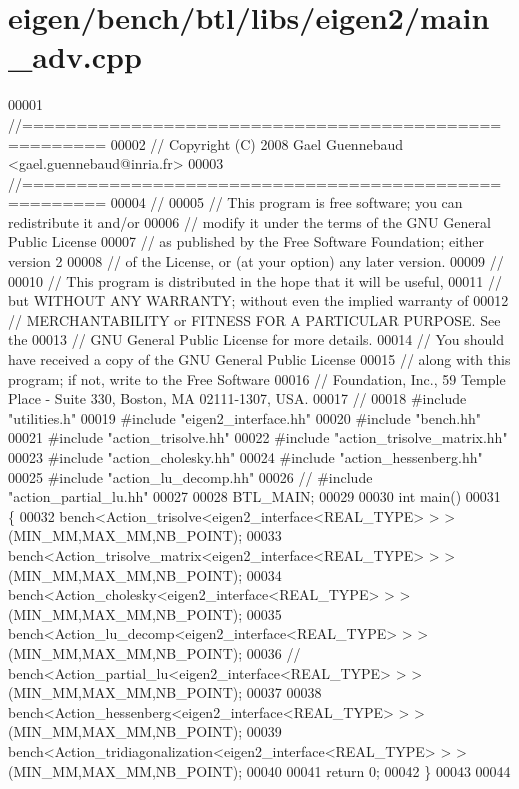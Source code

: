 \hypertarget{eigen_2bench_2btl_2libs_2eigen2_2main__adv_8cpp_source}{}\section{eigen/bench/btl/libs/eigen2/main\+\_\+adv.cpp}
\label{eigen_2bench_2btl_2libs_2eigen2_2main__adv_8cpp_source}

\begin{DoxyCode}
00001 \textcolor{comment}{//=====================================================}
00002 \textcolor{comment}{// Copyright (C) 2008 Gael Guennebaud <gael.guennebaud@inria.fr>}
00003 \textcolor{comment}{//=====================================================}
00004 \textcolor{comment}{//}
00005 \textcolor{comment}{// This program is free software; you can redistribute it and/or}
00006 \textcolor{comment}{// modify it under the terms of the GNU General Public License}
00007 \textcolor{comment}{// as published by the Free Software Foundation; either version 2}
00008 \textcolor{comment}{// of the License, or (at your option) any later version.}
00009 \textcolor{comment}{//}
00010 \textcolor{comment}{// This program is distributed in the hope that it will be useful,}
00011 \textcolor{comment}{// but WITHOUT ANY WARRANTY; without even the implied warranty of}
00012 \textcolor{comment}{// MERCHANTABILITY or FITNESS FOR A PARTICULAR PURPOSE.  See the}
00013 \textcolor{comment}{// GNU General Public License for more details.}
00014 \textcolor{comment}{// You should have received a copy of the GNU General Public License}
00015 \textcolor{comment}{// along with this program; if not, write to the Free Software}
00016 \textcolor{comment}{// Foundation, Inc., 59 Temple Place - Suite 330, Boston, MA  02111-1307, USA.}
00017 \textcolor{comment}{//}
00018 \textcolor{preprocessor}{#include "utilities.h"}
00019 \textcolor{preprocessor}{#include "eigen2\_interface.hh"}
00020 \textcolor{preprocessor}{#include "bench.hh"}
00021 \textcolor{preprocessor}{#include "action\_trisolve.hh"}
00022 \textcolor{preprocessor}{#include "action\_trisolve\_matrix.hh"}
00023 \textcolor{preprocessor}{#include "action\_cholesky.hh"}
00024 \textcolor{preprocessor}{#include "action\_hessenberg.hh"}
00025 \textcolor{preprocessor}{#include "action\_lu\_decomp.hh"}
00026 \textcolor{comment}{// #include "action\_partial\_lu.hh"}
00027 
00028 BTL\_MAIN;
00029 
00030 \textcolor{keywordtype}{int} main()
00031 \{
00032   bench<Action\_trisolve<eigen2\_interface<REAL\_TYPE> > >(MIN\_MM,MAX\_MM,NB\_POINT);
00033   bench<Action\_trisolve\_matrix<eigen2\_interface<REAL\_TYPE> > >(MIN\_MM,MAX\_MM,NB\_POINT);
00034   bench<Action\_cholesky<eigen2\_interface<REAL\_TYPE> > >(MIN\_MM,MAX\_MM,NB\_POINT);
00035   bench<Action\_lu\_decomp<eigen2\_interface<REAL\_TYPE> > >(MIN\_MM,MAX\_MM,NB\_POINT);
00036 \textcolor{comment}{//   bench<Action\_partial\_lu<eigen2\_interface<REAL\_TYPE> > >(MIN\_MM,MAX\_MM,NB\_POINT);}
00037 
00038   bench<Action\_hessenberg<eigen2\_interface<REAL\_TYPE> > >(MIN\_MM,MAX\_MM,NB\_POINT);
00039   bench<Action\_tridiagonalization<eigen2\_interface<REAL\_TYPE> > >(MIN\_MM,MAX\_MM,NB\_POINT);
00040 
00041   \textcolor{keywordflow}{return} 0;
00042 \}
00043 
00044 
\end{DoxyCode}
